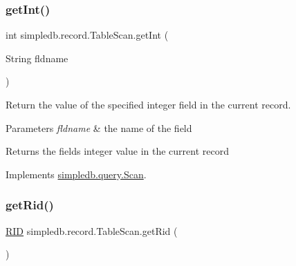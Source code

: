 \mbox{\label{classsimpledb_1_1record_1_1TableScan_abb08c41204e3130311ed1f264778b750}} 
\subsubsection{\texorpdfstring{get\+Int()}{getInt()}}
{\footnotesize\ttfamily int simpledb.\+record.\+Table\+Scan.\+get\+Int (\begin{DoxyParamCaption}\item[{String}]{fldname }\end{DoxyParamCaption})\hspace{0.3cm}{\ttfamily [inline]}}

Return the value of the specified integer field in the current record. 
\begin{DoxyParams}{Parameters}
{\em fldname} & the name of the field \\
\hline
\end{DoxyParams}
\begin{DoxyReturn}{Returns}
the field\textquotesingle{}s integer value in the current record 
\end{DoxyReturn}


Implements \hyperlink{interfacesimpledb_1_1query_1_1Scan_a2e064555e16240115167b5d42d2b3d19}{simpledb.\+query.\+Scan}.

\mbox{\label{classsimpledb_1_1record_1_1TableScan_ae04ff0088830ea94e2af70bdbb398a80}} 
\subsubsection{\texorpdfstring{get\+Rid()}{getRid()}}
{\footnotesize\ttfamily \hyperlink{classsimpledb_1_1record_1_1RID}{R\+ID} simpledb.\+record.\+Table\+Scan.\+get\+Rid (\begin{DoxyParamCaption}{ }\end{DoxyParamCaption})\hspace{0.3cm}{\ttfamily [inline]}}

